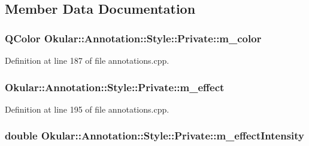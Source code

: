 \subsection{Member Data Documentation}
\hypertarget{classAnnotation_1_1Style_1_1Private_a4a2db0519a6cecbea22de950f62947ba}{
\subsubsection[{m\+\_\+color}]{\setlength{\rightskip}{0pt plus 5cm}Q\+Color Okular\+::\+Annotation\+::\+Style\+::\+Private\+::m\+\_\+color}}\label{classAnnotation_1_1Style_1_1Private_a4a2db0519a6cecbea22de950f62947ba}


Definition at line 187 of file annotations.\+cpp.

\hypertarget{classAnnotation_1_1Style_1_1Private_a50de9cc6a403082df92c6cabfbff3316}{
\subsubsection[{m\+\_\+effect}]{ Okular\+::\+Annotation\+::\+Style\+::\+Private\+::m\+\_\+effect}}\label{classAnnotation_1_1Style_1_1Private_a50de9cc6a403082df92c6cabfbff3316}


Definition at line 195 of file annotations.\+cpp.

\hypertarget{classAnnotation_1_1Style_1_1Private_af9edd4fe699dde5625fde82953f7814f}{
\subsubsection[{m\+\_\+effect\+Intensity}]{\setlength{\rightskip}{0pt plus 5cm}double Okular\+::\+Annotation\+::\+Style\+::\+Private\+::m\+\_\+effect\+Intensity}}\label{classAnnotation_1_1Style_1_1Private_af9edd4fe699dde5625fde82953f7814f}


